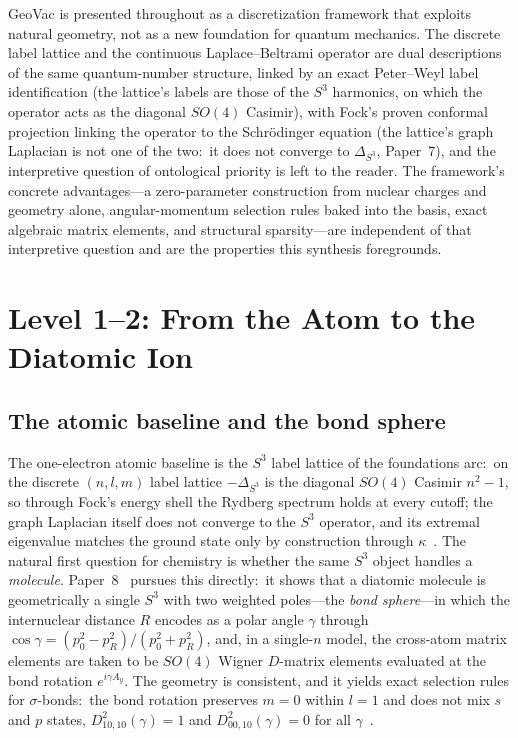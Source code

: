 \documentclass[aps,pra,twocolumn,superscriptaddress,longbibliography]{revtex4-2}
\newcommand{\gvc}[2]{#2}
\begin{document}
GeoVac is presented throughout as a discretization framework that
exploits natural geometry, not as a new foundation for quantum
mechanics.  The discrete label lattice and the continuous
Laplace--Beltrami operator are dual descriptions of the same
quantum-number structure, linked by an exact Peter--Weyl label identification (the lattice's
labels are those of the $S^3$ harmonics, on which the operator acts as
the diagonal $SO(4)$ Casimir), with Fock's proven conformal projection
linking the operator to the Schr\"odinger equation (\gvc{graph-s3-wall}{the lattice's graph Laplacian is not
one of the two:\ it does not converge to $\Delta_{S^3}$, Paper~7}), and
the interpretive question of ontological priority is left to the
reader.  The framework's concrete
advantages---a zero-parameter construction from nuclear charges and
geometry alone, angular-momentum selection rules baked into the basis,
exact algebraic matrix elements, and structural
sparsity---are independent of that interpretive question and are the
properties this synthesis foregrounds.

\section{Level 1--2: From the Atom to the Diatomic Ion}
\label{sec:level12}

\subsection{The atomic baseline and the bond sphere}

The one-electron atomic baseline is the $S^3$ label lattice of the
foundations arc:\ on the discrete $(n,l,m)$ label lattice $-\Delta_{S^3}$ is the
diagonal $SO(4)$ Casimir $n^2-1$, so through Fock's energy shell the
Rydberg spectrum holds at every cutoff; \gvc{graph-s3-wall}{the graph Laplacian itself does not
converge to the $S^3$ operator, and its extremal eigenvalue matches
the ground state only by construction through
$\kappa$}~\cite{loutey_paper1, loutey_paper7}.  The natural first
question for chemistry is whether the same $S^3$ object handles a
\emph{molecule}.  Paper~8~\cite{loutey_paper8} pursues this directly:\
it shows that a diatomic molecule is geometrically a single $S^3$ with
two weighted poles---the \emph{bond sphere}---in which the internuclear
distance $R$ encodes as a polar angle $\gamma$ through
$\cos\gamma = (p_0^2 - p_R^2)/(p_0^2 + p_R^2)$, and, in a single-$n$ model, the cross-atom
matrix elements are taken to be $SO(4)$ Wigner $D$-matrix elements evaluated at the
bond rotation $e^{i\gamma A_y}$.  The geometry is consistent, and it
yields exact selection rules for $\sigma$-bonds:\ the bond rotation
preserves $m=0$ within $l=1$ and does not mix $s$ and $p$ states,
$D^2_{10,10}(\gamma) = 1$ and $D^2_{00,10}(\gamma) = 0$ for all
$\gamma$~\cite{loutey_paper8}.
\end{document}
